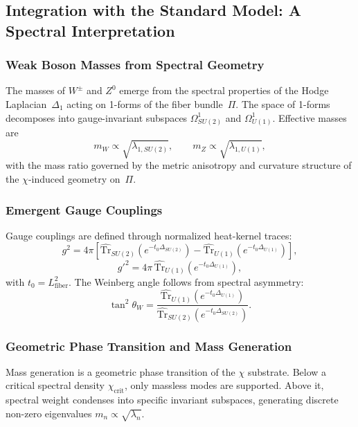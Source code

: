 \subsection{Integration with the Standard Model: A Spectral Interpretation}
\label{sec:standard-model-integration}

\subsubsection*{Weak Boson Masses from Spectral Geometry}
\label{sec:weak_boson_masses}

The masses of $W^\pm$ and $Z^0$ emerge from the spectral properties of
the Hodge Laplacian~$\Delta_1$ acting on 1-forms of the fiber bundle~$\Pi$.
The space of 1-forms decomposes into gauge-invariant subspaces $\Omega^1_{SU(2)}$ and $\Omega^1_{U(1)}$.
Effective masses are
\[
  m_W \propto \sqrt{\lambda_{1,SU(2)}}, \qquad
  m_Z \propto \sqrt{\lambda_{1,U(1)}},
\]
with the mass ratio governed by the metric anisotropy and curvature
structure of the $\chi$-induced geometry on~$\Pi$.

\subsubsection*{Emergent Gauge Couplings}
\label{sec:gauge_couplings}

Gauge couplings are defined through normalized heat-kernel traces:
\[
  g^2 = 4\pi \left[
    \widehat{\mathrm{Tr}}_{SU(2)}
      \!\left(e^{-t_0 \Delta_{SU(2)}}\right)
    - \widehat{\mathrm{Tr}}_{U(1)}
      \!\left(e^{-t_0 \Delta_{U(1)}}\right)
  \right],
\]
\[
  g'^2 = 4\pi\,
    \widehat{\mathrm{Tr}}_{U(1)}
      \!\left(e^{-t_0 \Delta_{U(1)}}\right),
\]
with $t_0 = L_{\text{fiber}}^2$.
The Weinberg angle follows from spectral asymmetry:
\[
  \tan^2\theta_W =
  \frac{\widehat{\mathrm{Tr}}_{U(1)}
    (e^{-t_0 \Delta_{U(1)}})}
  {\widehat{\mathrm{Tr}}_{SU(2)}
    (e^{-t_0 \Delta_{SU(2)}})}.
\]

\subsubsection*{Geometric Phase Transition and Mass Generation}
\label{sec:higgs_mechanism}

Mass generation is a geometric phase transition of the $\chi$ substrate.
Below a critical spectral density $\chi_{\text{crit}}$, only massless
modes are supported.
Above it, spectral weight condenses into specific invariant subspaces,
generating discrete non-zero eigenvalues $m_n \propto \sqrt{\lambda_n}$.

